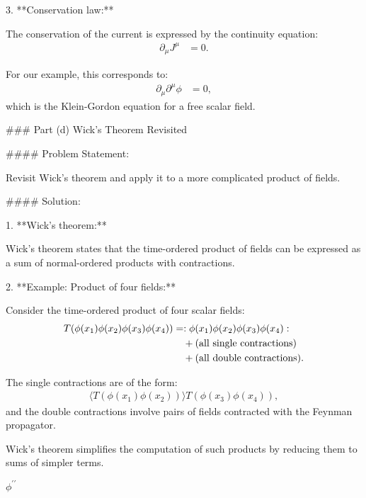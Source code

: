 3. **Conservation law:**

   The conservation of the current is expressed by the continuity equation:
   \begin{align}
       \partial_\mu J^\mu &= 0.
   \end{align}

   For our example, this corresponds to:
   \begin{align}
       \partial_\mu \partial^\mu \phi &= 0,
   \end{align}
   which is the Klein-Gordon equation for a free scalar field.

### Part (d) Wick's Theorem Revisited

#### Problem Statement:

Revisit Wick's theorem and apply it to a more complicated product of fields.

#### Solution:

1. **Wick's theorem:**

   Wick's theorem states that the time-ordered product of fields can be expressed as a sum of normal-ordered products with contractions.

2. **Example: Product of four fields:**

   Consider the time-ordered product of four scalar fields:
   \begin{align}
       T(\phi(x_1) \phi(x_2) \phi(x_3) \phi(x_4)) &= :\phi(x_1) \phi(x_2) \phi(x_3) \phi(x_4): \notag \\
       &\quad + \text{(all single contractions)} \notag \\
       &\quad + \text{(all double contractions)}.
   \end{align}

   The single contractions are of the form:
   \begin{align}
       \langle T(\phi(x_1) \phi(x_2)) \rangle T(\phi(x_3) \phi(x_4)),
   \end{align}
   and the double contractions involve pairs of fields contracted with the Feynman propagator.

   Wick's theorem simplifies the computation of such products by reducing them to sums of simpler terms.

   $\phi^{\prime\prime}$